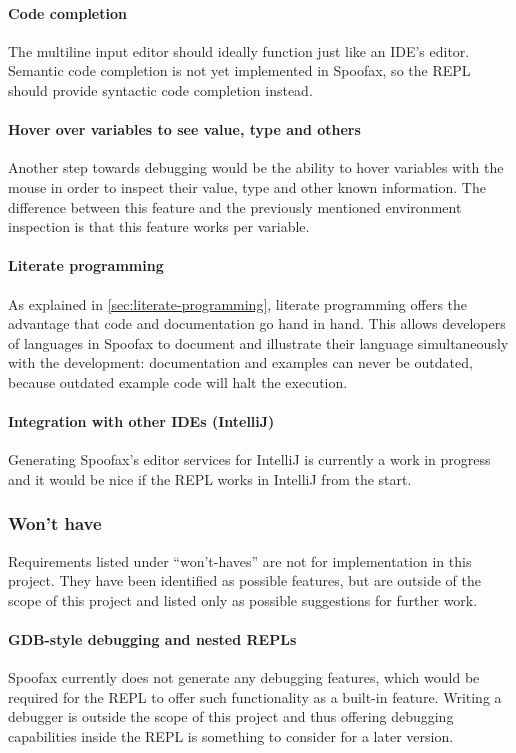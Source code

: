 \paragraph{Code completion} The multiline input editor should ideally function
just like an IDE's editor. Semantic code completion is not yet implemented in
Spoofax, so the REPL should provide syntactic code completion instead.

\paragraph{Hover over variables to see value, type and others} Another step
towards debugging would be the ability to hover variables with the mouse in
order to inspect their value, type and other known information. The difference
between this feature and the previously mentioned environment inspection is that
this feature works per variable.

\paragraph{Literate programming} As explained in
\cref{sec:literate-programming}, literate programming offers the advantage that
code and documentation go hand in hand. This allows developers of languages in
Spoofax to document and illustrate their language simultaneously with the
development: documentation and examples can never be outdated, because outdated
example code will halt the execution.

\paragraph{Integration with other IDEs (IntelliJ)} Generating Spoofax's editor
services for IntelliJ is currently a work in progress and it would be nice if
the REPL works in IntelliJ from the start.

\subsubsection{Won't have}

Requirements listed under ``won't-haves'' are not for implementation in this
project. They have been identified as possible features, but are outside of the
scope of this project and listed only as possible suggestions for further work.

\paragraph{GDB-style debugging and nested REPLs} Spoofax currently does not
generate any debugging features, which would be required for the REPL to offer
such functionality as a built-in feature. Writing a debugger is outside
the scope of this project and thus offering debugging capabilities inside
the REPL is something to consider for a later version.

